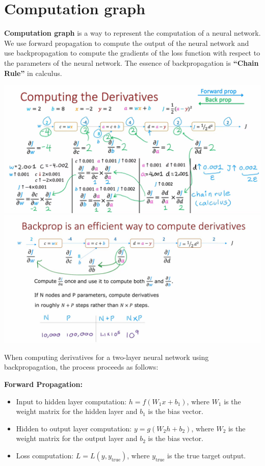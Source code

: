 \section{Computation graph}
\textbf{Computation graph} is a way to represent the computation of a neural network.
We use forward propagation to compute the output of the neural network and use backpropagation to compute the gradients of the loss function with respect to the parameters of the neural network.
The essence of backpropagation is \textbf{``Chain Rule''} in calculus.\par
\includegraphics*[width=\textwidth]{images/9.4}
\includegraphics*[width=\textwidth]{images/9.5}
\par

When computing derivatives for a two-layer neural network using backpropagation, the process proceeds as follows:

\textbf{Forward Propagation:}
\begin{itemize}
   \item Input to hidden layer computation: \( h = f(W_1 x + b_1) \), where \( W_1 \) is the weight matrix for the hidden layer and \( b_1 \) is the bias vector.
   \item Hidden to output layer computation: \( y = g(W_2 h + b_2) \), where \( W_2 \) is the weight matrix for the output layer and \( b_2 \) is the bias vector.
   \item Loss computation: \( L = L(y, y_{\text{true}}) \), where \( y_{\text{true}} \) is the true target output.
\end{itemize}

